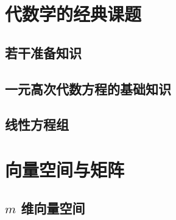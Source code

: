 \documentclass[a4paper, 11pt]{ctexbook}
\begin{document}
    \chapter{代数学的经典课题}
        \section{若干准备知识}
        \section{一元高次代数方程的基础知识}
        \section{线性方程组}
    \chapter{向量空间与矩阵}
        \section{$m$ 维向量空间}
            
\end{document}
